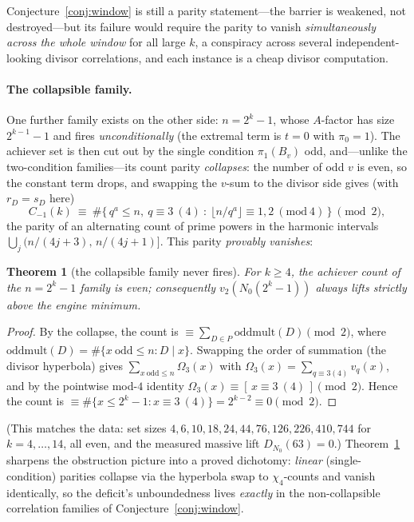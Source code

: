 \documentclass[11pt]{article}
\newtheorem{theorem}{Theorem}
\theoremstyle{remark}\newtheorem{remark}[theorem]{Remark}
\begin{document}
\noindent Conjecture~\ref{conj:window} is still a parity statement---the barrier is weakened, not
destroyed---but its failure would require the parity to vanish \emph{simultaneously across the whole
window} for all large $k$, a conspiracy across several independent-looking divisor correlations, and
each instance is a cheap divisor computation.

\paragraph{The collapsible family.} One further family exists on the other side: $n=2^k-1$, whose
$A$-factor has size $2^{k-1}-1$ and fires \emph{unconditionally} (the extremal term is $t=0$ with
$\pi_0=1$). The achiever set is then cut out by the single condition $\pi_1(B_v)$ odd, and---unlike
the two-condition families---its count parity \emph{collapses}: the number of odd $v$ is even, so the
constant term drops, and swapping the $v$-sum to the divisor side gives (with $r_D=s_D$ here)
\[
   C_{-1}(k)\ \equiv\ \#\{\,q^a\le n,\ q\equiv3\ (4)\ :\ \lfloor n/q^a\rfloor\equiv1,2\ (\mathrm{mod}\
   4)\,\}\ \pmod2,
\]
the parity of an alternating count of prime powers in the harmonic intervals
$\bigcup_j(n/(4j{+}3),\,n/(4j{+}1)]$. This parity \emph{provably vanishes}:

\begin{theorem}[the collapsible family never fires]\label{thm:cminus}
For $k\ge4$, the achiever count of the $n=2^k-1$ family is even; consequently
$v_2(N_0(2^k-1))$ always lifts strictly above the engine minimum.
\end{theorem}
\begin{proof}
By the collapse, the count is $\equiv\sum_{D\in P}\mathrm{oddmult}(D)\pmod 2$, where
$\mathrm{oddmult}(D)=\#\{x\ \mathrm{odd}\le n:D\mid x\}$. Swapping the order of summation
(the divisor hyperbola) gives $\sum_{x\ \mathrm{odd}\le n}\Omega_3(x)$ with
$\Omega_3(x)=\sum_{q\equiv3(4)}v_q(x)$, and by the pointwise mod-$4$ identity
$\Omega_3(x)\equiv[\,x\equiv3\ (4)\,]\pmod 2$. Hence the count is
$\equiv\#\{x\le 2^k-1:x\equiv3\ (4)\}=2^{k-2}\equiv0\pmod2$.
\end{proof}

\noindent (This matches the data: set sizes $4,6,10,18,24,44,76,126,226,410,744$ for $k=4,\dots,14$,
all even, and the measured massive lift $D_{N_0}(63)=0$.) Theorem~\ref{thm:cminus} sharpens the
obstruction picture into a proved dichotomy: \emph{linear} (single-condition) parities collapse via
the hyperbola swap to $\chi_4$-counts and vanish identically, so the deficit's unboundedness lives
\emph{exactly} in the non-collapsible correlation families of Conjecture~\ref{conj:window}.
\end{document}
